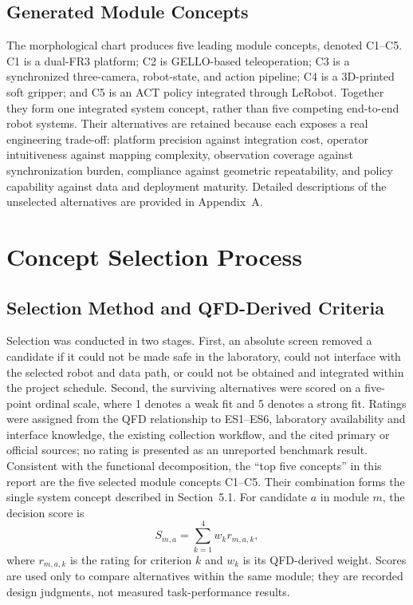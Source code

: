 \documentclass[12pt, letterpaper]{article}
\begin{document}
\subsection{Generated Module Concepts}

The morphological chart produces five leading module concepts, denoted C1--C5. C1 is a dual-FR3 platform; C2 is GELLO-based teleoperation; C3 is a synchronized three-camera, robot-state, and action pipeline; C4 is a 3D-printed soft gripper; and C5 is an ACT policy integrated through LeRobot. Together they form one integrated system concept, rather than five competing end-to-end robot systems. Their alternatives are retained because each exposes a real engineering trade-off: platform precision against integration cost, operator intuitiveness against mapping complexity, observation coverage against synchronization burden, compliance against geometric repeatability, and policy capability against data and deployment maturity. Detailed descriptions of the unselected alternatives are provided in Appendix~A.

\section{Concept Selection Process}

\subsection{Selection Method and QFD-Derived Criteria}

Selection was conducted in two stages. First, an absolute screen removed a candidate if it could not be made safe in the laboratory, could not interface with the selected robot and data path, or could not be obtained and integrated within the project schedule. Second, the surviving alternatives were scored on a five-point ordinal scale, where 1 denotes a weak fit and 5 denotes a strong fit. Ratings were assigned from the QFD relationship to ES1--ES6, laboratory availability and interface knowledge, the existing collection workflow, and the cited primary or official sources; no rating is presented as an unreported benchmark result. Consistent with the functional decomposition, the ``top five concepts'' in this report are the five selected module concepts C1--C5. Their combination forms the single system concept described in Section~5.1. For candidate $a$ in module $m$, the decision score is
\begin{equation}
S_{m,a}=\sum_{k=1}^{4} w_k r_{m,a,k},
\label{eq:module-selection-score}
\end{equation}
where $r_{m,a,k}$ is the rating for criterion $k$ and $w_k$ is its QFD-derived weight. Scores are used only to compare alternatives within the same module; they are recorded design judgments, not measured task-performance results.
\end{document}
